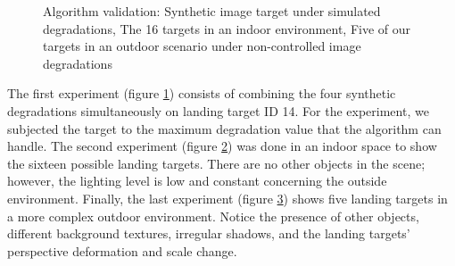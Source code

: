 \begin{figure}[h!]
\centering
\begin{subfigure}[t]{\textwidth+20pt\relax}
    \caption{} \label{fig:synthetic_result}
\end{subfigure}\hfill
\begin{subfigure}[t]{0.315\textwidth}
    \caption{} \label{fig:indoor_result}
\end{subfigure}\hfill
\begin{subfigure}[t]{0.315\textwidth}
    \caption{}  \label{fig:outdoor_result}
\end{subfigure}
\caption{Algorithm validation:  Synthetic image target under simulated degradations,  The 16 targets in an indoor environment,  Five of our targets in an outdoor scenario under non-controlled image degradations}\label{fig:validation}
\end{figure}

The first experiment (figure \ref{fig:synthetic_result}) consists of combining the four synthetic degradations simultaneously on landing target ID 14. For the experiment, we subjected the target to the maximum degradation value that the algorithm can handle. The second experiment (figure \ref{fig:indoor_result}) was done in an indoor space to show the sixteen possible landing targets. There are no other objects in the scene; however, the lighting level is low and constant concerning the outside environment. Finally, the last experiment (figure \ref{fig:outdoor_result}) shows five landing targets in a more complex outdoor environment. Notice the presence of other objects, different background textures, irregular shadows, and the landing targets' perspective deformation and scale change. 

